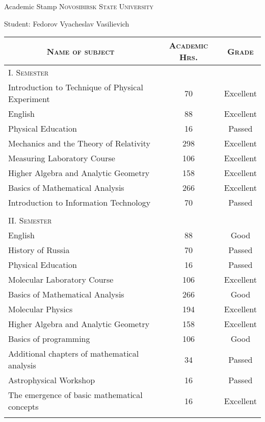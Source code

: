 \documentclass[a4paper,12pt]{article}
\begin{document}
\newpage
\par{\centering\Large \hypertarget{nsu}{Academic Stamp \textsc{Novosibirsk State University}}\par}
\large{\centering Student: Fedorov Vyacheslav Vasilievich\par}\normalsize 
\begin{center}
\begin{tabular}{lcc}
\multicolumn{1}{c}{\textsc{Name of subject}}&\textsc{Academic
Hrs.}&\textsc{Grade}\\ \hline

\textsc{I. Semester}\\
Introduction to Technique of Physical Experiment	&70&	Excellent\\
English	&88&	Excellent\\
Physical Education	&16&	Passed\\
Mechanics and the Theory of Relativity	&298&	Excellent\\
Measuring Laboratory Course 	&106&	Excellent\\
Higher Algebra and Analytic Geometry	&158	&Excellent\\
Basics of Mathematical Analysis 	&266&	Excellent\\
Introduction to Information Technology	&70&	Passed\\ \\

\textsc{II. Semester}\\
English 	&88&	Good\\
History of Russia	&70&	Passed\\
Physical Education	&16&	Passed\\
Molecular Laboratory Course 	&106&	Excellent\\
Basics of Mathematical Analysis 	&266&	Good\\
Molecular Physics	&194&	Excellent\\
Higher Algebra and Analytic Geometry	&158	&Excellent\\
Basics of programming	&106&	Good\\
Additional chapters of mathematical analysis	&34&	Passed\\
Astrophysical Workshop	&16&	Passed\\
The emergence of basic mathematical concepts	&16	&Excellent\\
\\


\end{tabular}
\end{center}
\end{document}
